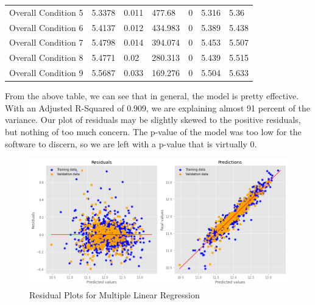 \documentclass{article}
\begin{document}
\begin{table}[H]
\begin{tabular}{lllllll}
		Overall Condition 5              & 5.3378                    & 0.011                        & 477.68                 & 0                                       & 5.316                         & 5.36                          \\
		Overall Condition 6              & 5.4137                    & 0.012                        & 434.983                & 0                                       & 5.389                         & 5.438                         \\
		Overall Condition 7              & 5.4798                    & 0.014                        & 394.074                & 0                                       & 5.453                         & 5.507                         \\
		Overall Condition 8              & 5.4771                    & 0.02                         & 280.313                & 0                                       & 5.439                         & 5.515                         \\
		Overall Condition 9              & 5.5687                    & 0.033                        & 169.276                & 0                                       & 5.504                         & 5.633                        
		\end{tabular}
		\end{table}

	From the above table, we can see that in general, the model is pretty effective. With an Adjusted R-Squared of 0.909, we are explaining almost 91 percent of the variance. Our plot of residuals may be slightly skewed to the positive residuals, but nothing of too much concern. The p-value of the model was too low for the software to discern, so we are left with a p-value that is virtually 0. 

	\begin{figure}[H]
		\includegraphics[width=\textwidth]{mlrplot}
		\caption{Residual Plots for Multiple Linear Regression}
		\label{fig:skew}
	\end{figure}
\end{document}
